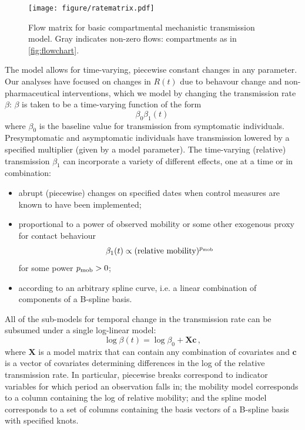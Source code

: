 \documentclass[12pt]{article}\usepackage[]{graphicx}\usepackage[]{color}
\begin{document}
\begin{figure}[ht!]
\color{fgcolor}
\texttt{[image: figure/ratematrix.pdf]} 

\caption{Flow matrix for basic compartmental mechanistic transmission
  model.  Gray indicates non-zero flows: compartments as in
  \cref{fig:flowchart}.  
  }
\label{fig:flowmatrix}
\end{figure}

The model allows for time-varying, piecewise constant changes in any
parameter. Our analyses have focused on changes in $R(t)$ due
to behavour change and non-pharmaceutical interventions, which we model
by changing the transmission rate $\beta$: $\beta$
is taken to be a time-varying function of the form
\begin{equation}
  \beta_0 \beta_1(t)  \,
\end{equation}
where $\beta_0$ is the baseline value for transmission
from symptomatic individuals. Presymptomatic and asymptomatic individuals have transmission
lowered by a specified multiplier (given by a model parameter).
The time-varying (relative) transmission $\beta_1$ can incorporate a variety of different effects, one at a time or in combination:
\begin{itemize}
\item abrupt (piecewise) changes on specified dates when control
  measures are known to have been implemented;
\item proportional to a power of observed mobility or some other
  exogenous proxy for contact behaviour
\begin{equation}\label{eq:pmob}
  \beta_1(t) \propto (\text{relative mobility})^{p_{\rm mob}}
\end{equation}
for some power $p_{\rm mob}>0$;
\item according to an arbitrary spline curve, i.e. a linear combination
  of components of a B-spline basis.
\end{itemize}

All of the sub-models for temporal change in the transmission
rate can be subsumed under a single log-linear model:
\begin{equation}\label{eq:betamodel}
\log \beta(t) = \log \beta_0 + \boldsymbol{X}\boldsymbol{c}
\,,
\end{equation}
where $\boldsymbol{X}$ is a model matrix that can contain any combination
of covariates and $\boldsymbol{c}$ is a vector of covariates determining
differences in the log of the relative transmission rate.
In particular, piecewise breaks correspond to indicator variables
for which period an observation falls in; the mobility model corresponds to a column
containing the log of relative mobility; and the spline model corresponds to a set of
columns containing the basis vectors of a B-spline basis with specified knots.
\end{document}
